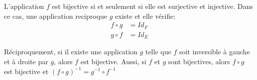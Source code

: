 \section*{}
L'application \(f\) est bijective si et seulement si elle est surjective et injective.  
Dans ce cas, une application reciproque \(g\) existe et elle vérifie:
\begin{align*}
   f \circ g &= Id_F \\
   g \circ f &= Id_E
\end{align*}

Réciproquement, si il existe une application \(g\) telle que \(f\) soit inversible à gauche et à droite par \(g\), alors \(f\) est bijective.\+
Aussi, si \(f\) et \(g\) sont bijectives, alors \(f \circ g\) est bijective et \((f \circ g)^{-1} = g^{-1} \circ f^{-1}\)